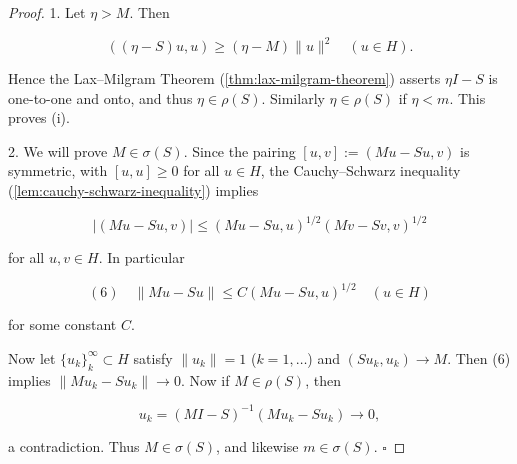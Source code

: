 \begin{proof}
1. Let $\eta > M$. Then

$$((\eta - S)u, u) \geq (\eta - M)\|u\|^2 \quad (u \in H).$$

Hence the Lax--Milgram Theorem (\cref{thm:lax-milgram-theorem}) asserts $\eta I - S$ is one-to-one and onto, and thus $\eta \in \rho(S)$. Similarly $\eta \in \rho(S)$ if $\eta < m$. This proves (i).

2. We will prove $M \in \sigma(S)$. Since the pairing $[u, v] := (Mu - Su, v)$ is symmetric, with $[u, u] \geq 0$ for all $u \in H$, the Cauchy--Schwarz inequality (\cref{lem:cauchy-schwarz-inequality}) implies

$$|(Mu - Su, v)| \leq (Mu - Su, u)^{1/2}(Mv - Sv, v)^{1/2}$$

for all $u, v \in H$. In particular

$$(6) \quad \|Mu - Su\| \leq C(Mu - Su, u)^{1/2} \quad (u \in H)$$

for some constant $C$.

Now let $\{u_k\}_k^{\infty} \subset H$ satisfy $\|u_k\| = 1$ ($k = 1, \ldots$) and $(Su_k, u_k) \to M$. Then (6) implies $\|Mu_k - Su_k\| \to 0$. Now if $M \in \rho(S)$, then

$$u_k = (MI - S)^{-1}(Mu_k - Su_k) \to 0,$$

a contradiction. Thus $M \in \sigma(S)$, and likewise $m \in \sigma(S)$. $\square$
\end{proof}
